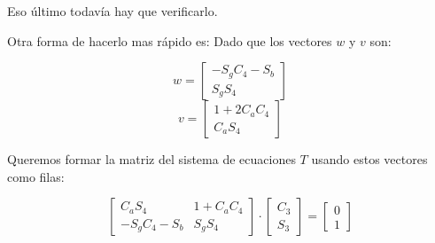 \documentclass[a4paper,12pt]{article}
\begin{document}
Eso último todavía hay que verificarlo.


Otra forma de hacerlo mas rápido es:
Dado que los vectores \( w \) y \( v \) son:

\[
w = \begin{bmatrix} -S_g C_4 - S_b \\ S_g S_4 \end{bmatrix}
\]
\[
v = \begin{bmatrix} 1 + 2C_a C_4 \\ C_a S_4 \end{bmatrix}
\]

Queremos formar la matriz del sistema de ecuaciones \( T \) usando estos vectores como filas:

\[
\begin{bmatrix} C_a S_4 & 1 + C_a C_4 \\ -S_g C_4 - S_b & S_g S_4 \end{bmatrix}
\cdot
\begin{bmatrix}C_3\\S_3\end{bmatrix}
=
\begin{bmatrix}0\\1\end{bmatrix}
\]
\end{document}
